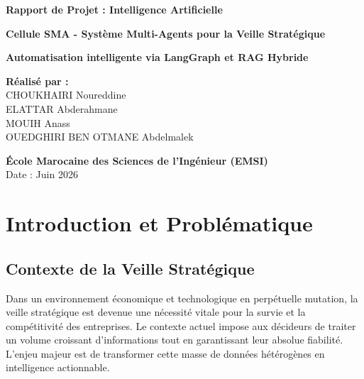 \documentclass[12pt,a4paper]{report}
\begin{document}
\begin{titlepage}
    \begin{center}
        \vspace*{1cm}
        
        \Huge
        \textbf{Rapport de Projet : Intelligence Artificielle}
        
        \vspace{0.5cm}
        \LARGE
        \textbf{Cellule SMA - Système Multi-Agents pour la Veille Stratégique}
        
        \vspace{1.5cm}
        
        \textbf{Automatisation intelligente via LangGraph et RAG Hybride}
        
        \vfill
        
        \Large
        \textbf{Réalisé par :}\\
        CHOUKHAIRI Noureddine\\
        ELATTAR Abderahmane\\
        MOUIH Anass\\
        OUEDGHIRI BEN OTMANE Abdelmalek\\
        
        \vspace{1.5cm}
        
        \textbf{École Marocaine des Sciences de l'Ingénieur (EMSI)}\\
        \vspace{0.5cm}
        Date : Juin 2026
        
    \end{center}
\end{titlepage}

\tableofcontents
\newpage

\chapter{Introduction et Problématique}

\section{Contexte de la Veille Stratégique}
Dans un environnement économique et technologique en perpétuelle mutation, la veille stratégique est devenue une nécessité vitale pour la survie et la compétitivité des entreprises. Le contexte actuel impose aux décideurs de traiter un volume croissant d'informations tout en garantissant leur absolue fiabilité. L'enjeu majeur est de transformer cette masse de données hétérogènes en intelligence actionnable.
\end{document}

